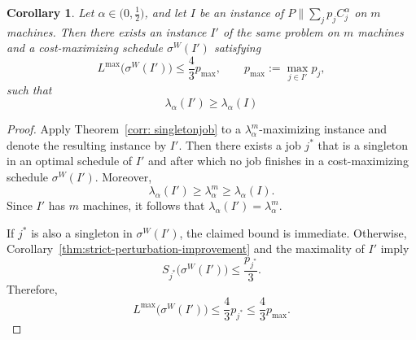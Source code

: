 \documentclass[%
english, titlepage=false %
]{./tum-templates/book/tumbook}
\newtheorem{corollary}{Corollary}
\newcommand{\Problem}{P\!\parallel\!\sum_j p_j C^{\alpha}_j}
\begin{document}
\begin{corollary}\label{corr: makespandbound}
Let $\alpha\in\Big(0,\frac12\Big)$, and let $I$ be an instance of $\Problem$
on $m$ machines. Then there exists an instance $I'$ of the same
problem on $m$ machines and a cost-maximizing schedule $\sigma^W(I')$ satisfying
\[
    L^{\max}\bigl(\sigma^W(I')\bigr)
    \leq\frac43p_{\max},
    \qquad
    p_{\max}:=\max_{j\in I'}p_j,
\]
such that
\[
    \lambda_\alpha(I')\geq\lambda_\alpha(I)
\]

\end{corollary}

\begin{proof}
Apply Theorem~\ref{corr: singletonjob} to a
$\lambda_\alpha^m$-maximizing instance and denote the resulting
instance by $I'$. Then there exists a job $j^*$ that is a singleton
in an optimal schedule of $I'$ and after which no job finishes in a
cost-maximizing schedule $\sigma^W(I')$. Moreover,
\[
    \lambda_\alpha(I')
    \geq\lambda_\alpha^m
    \geq\lambda_\alpha(I).
\]
Since $I'$ has $m$ machines, it follows that
$\lambda_\alpha(I')=\lambda_\alpha^m$.

If $j^*$ is also a singleton in $\sigma^W(I')$, the claimed bound is
immediate. Otherwise,
Corollary~\ref{thm:strict-perturbation-improvement} and the maximality
of $I'$ imply
\[
    S_{j^*}\bigl(\sigma^W(I')\bigr)
    \leq\frac{p_{j^*}}3.
\]
Therefore,
\[
    L^{\max}\bigl(\sigma^W(I')\bigr)
    \leq\frac43p_{j^*}
    \leq\frac43p_{\max}.
\]
\end{proof}
\newpage
\end{document}
